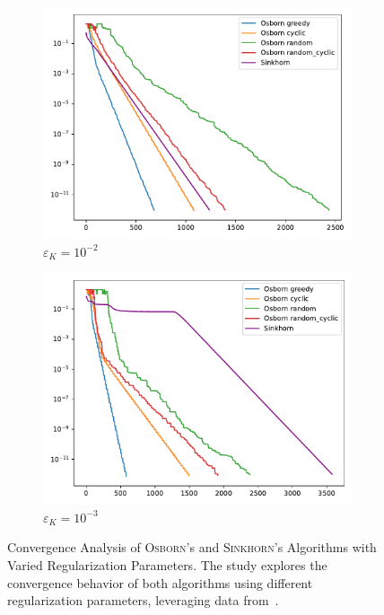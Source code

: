 \begin{figure}[H]
\begin{subfigure}[b]{.23\textwidth}
        \centering
        \includegraphics[width=\textwidth]{figures/dist2_kernel_1e-12/osborn_vs_sinkhorn_dist2_0.01_1e-12}
        \caption{\(\varepsilon_K = 10^{-2}\)}
    \end{subfigure}
    \hfill
    \begin{subfigure}[b]{.23\textwidth}
        \centering
        \includegraphics[width=\textwidth]{figures/dist2_kernel_1e-12/osborn_vs_sinkhorn_dist2_0.001_1e-12}
        \caption{\(\varepsilon_K = 10^{-3}\)}
    \end{subfigure}
    \caption{Convergence Analysis of \textsc{Osborn}'s and \textsc{Sinkhorn}'s Algorithms with Varied Regularization Parameters. The study explores the convergence behavior of both algorithms using different regularization parameters, leveraging data from~.}\label{fig:regularization}
\end{figure}

